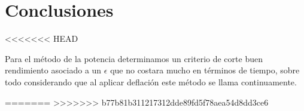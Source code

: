\section{Conclusiones}%
<<<<<<< HEAD

Para el método de la potencia determinamos un criterio de corte buen rendimiento asociado a un $\epsilon$ que no costara mucho en términos de tiempo, sobre todo considerando que al aplicar deflación este método se llama continuamente.


=======
>>>>>>> b77b81b311217312dde89fd5f78aea54d8dd3ce6
\label{sec:conclusiones}
